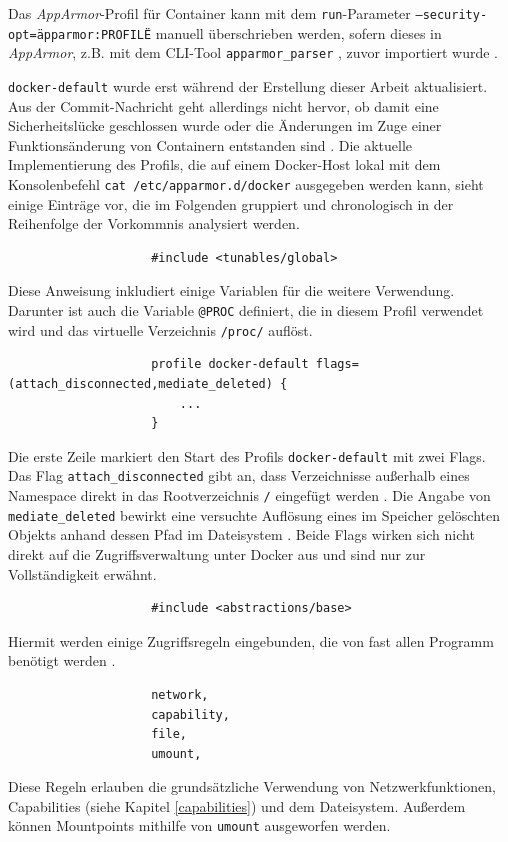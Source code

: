 \documentclass[../main.tex]{subfiles}
\begin{document}
				Das \emph{AppArmor}-Profil für Container kann mit dem \texttt{run}-Parameter \texttt{--security-opt=\"apparmor:PROFILE\"} manuell überschrieben werden, sofern dieses in \emph{AppArmor}, z.B. mit dem \acrshort{CLI}-Tool \texttt{apparmor\_parser} \cite{apparmorParser}, zuvor importiert wurde \cite{dockerRun}.

				\texttt{docker-default} wurde erst während der Erstellung dieser Arbeit aktualisiert. Aus der Commit-Nachricht geht allerdings nicht hervor, ob damit eine Sicherheitslücke geschlossen wurde oder die Änderungen im Zuge einer Funktionsänderung von Containern entstanden sind \cite{githubAppArmorProfileContainerFix}. Die aktuelle Implementierung des Profils, die auf einem Docker-Host lokal mit dem Konsolenbefehl \texttt{cat /etc/apparmor.d/docker} ausgegeben werden kann, sieht einige Einträge vor, die im Folgenden gruppiert und chronologisch in der Reihenfolge der Vorkommnis analysiert werden.

				\begin{lstlisting}
					#include <tunables/global>
				\end{lstlisting}
				Diese Anweisung inkludiert einige Variablen für die weitere Verwendung. Darunter ist auch die Variable \texttt{@{PROC}} definiert, die in diesem Profil verwendet wird und das virtuelle Verzeichnis \texttt{/proc/} auflöst.

				\begin{lstlisting}
					profile docker-default flags=(attach_disconnected,mediate_deleted) {
						...
					}
				\end{lstlisting}
				Die erste Zeile markiert den Start des Profils \texttt{docker-default} mit zwei Flags. Das Flag \texttt{attach\_disconnected} gibt an, dass Verzeichnisse außerhalb eines Namespace direkt in das Rootverzeichnis \texttt{/} eingefügt werden \cite{apparmorPolicyReference}. Die Angabe von \texttt{mediate\_deleted} bewirkt eine versuchte Auflösung eines im Speicher gelöschten Objekts anhand dessen Pfad im Dateisystem \cite{apparmorFAQ}. Beide Flags wirken sich nicht direkt auf die Zugriffsverwaltung unter Docker aus und sind nur zur Vollständigkeit erwähnt.

				\begin{lstlisting}
					#include <abstractions/base>
				\end{lstlisting}
				Hiermit werden einige Zugriffsregeln eingebunden, die von fast allen Programm benötigt werden \cite[S.100]{SELinuxApparmor}.

				\begin{lstlisting}
					network,
					capability,
					file,
					umount,
				\end{lstlisting}
				Diese Regeln erlauben die grundsätzliche Verwendung von Netzwerkfunktionen, Capabilities (siehe Kapitel \ref{capabilities}) und dem Dateisystem. Außerdem können Mountpoints mithilfe von \texttt{umount} ausgeworfen werden.
\end{document}
